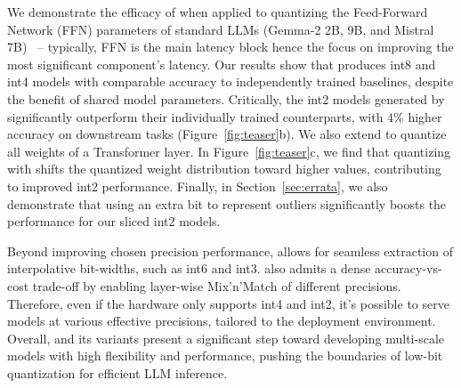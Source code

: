 
We demonstrate the efficacy of \alg when applied to quantizing the Feed-Forward Network (FFN) parameters of standard LLMs (Gemma-2 2B, 9B, and Mistral 7B)~\citep{vaswani2017attention} -- typically, FFN is the main latency block hence the focus on improving the most significant component's latency. Our results show that \alg produces int8 and int4 models with comparable accuracy to independently trained baselines, despite the benefit of shared model parameters. Critically, the int2 models generated by \alg significantly outperform their individually trained counterparts, with $4$\% higher accuracy on downstream tasks (Figure~\ref{fig:teaser}b). We also extend \alg to quantize all weights of a Transformer layer.  In Figure~\ref{fig:teaser}c, we find that quantizing with \alg shifts the quantized weight distribution toward higher values, contributing to improved int2 performance. Finally, in Section~\ref{sec:errata}, we also demonstrate that using an extra bit to represent outliers significantly boosts the performance for our sliced int2 models.

Beyond improving chosen precision performance, \alg allows for seamless extraction of interpolative bit-widths, such as int6 and int3. \alg also admits a dense accuracy-vs-cost trade-off by enabling layer-wise Mix'n'Match of different precisions. Therefore, even if the hardware only supports int4 and int2, it's possible to serve models at various effective precisions, tailored to the deployment environment. Overall, \alg and its variants present a significant step toward developing multi-scale models with high flexibility and performance, pushing the boundaries of low-bit quantization for efficient LLM inference.



